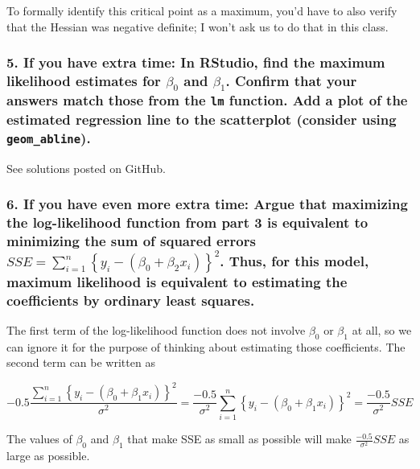 \documentclass[]{article}
\begin{document}
To formally identify this critical point as a maximum, you'd have to
also verify that the Hessian was negative definite; I won't ask us to do
that in this class.

\subsubsection{\texorpdfstring{5. If you have extra time: In RStudio,
find the maximum likelihood estimates for \(\beta_0\) and \(\beta_1\).
Confirm that your answers match those from the \texttt{lm} function. Add
a plot of the estimated regression line to the scatterplot (consider
using
\texttt{geom\_abline}).}{5. If you have extra time: In RStudio, find the maximum likelihood estimates for \textbackslash{}beta\_0 and \textbackslash{}beta\_1. Confirm that your answers match those from the lm function. Add a plot of the estimated regression line to the scatterplot (consider using geom\_abline).}}\label{if-you-have-extra-time-in-rstudio-find-the-maximum-likelihood-estimates-for-beta_0-and-beta_1.-confirm-that-your-answers-match-those-from-the-lm-function.-add-a-plot-of-the-estimated-regression-line-to-the-scatterplot-consider-using-geom_abline.}

See solutions posted on GitHub.

\subsubsection{\texorpdfstring{6. If you have even more extra time:
Argue that maximizing the log-likelihood function from part 3 is
equivalent to minimizing the sum of squared errors
\(SSE = \sum_{i = 1}^n \left\{y_i - (\beta_0 + \beta_2 x_{i}) \right\}^2\).
Thus, for this model, maximum likelihood is equivalent to estimating the
coefficients by ordinary least
squares.}{6. If you have even more extra time: Argue that maximizing the log-likelihood function from part 3 is equivalent to minimizing the sum of squared errors SSE = \textbackslash{}sum\_\{i = 1\}\^{}n \textbackslash{}left\textbackslash{}\{y\_i - (\textbackslash{}beta\_0 + \textbackslash{}beta\_2 x\_\{i\}) \textbackslash{}right\textbackslash{}\}\^{}2. Thus, for this model, maximum likelihood is equivalent to estimating the coefficients by ordinary least squares.}}\label{if-you-have-even-more-extra-time-argue-that-maximizing-the-log-likelihood-function-from-part-3-is-equivalent-to-minimizing-the-sum-of-squared-errors-sse-sum_i-1n-lefty_i---beta_0-beta_2-x_i-right2.-thus-for-this-model-maximum-likelihood-is-equivalent-to-estimating-the-coefficients-by-ordinary-least-squares.}

The first term of the log-likelihood function does not involve
\(\beta_0\) or \(\beta_1\) at all, so we can ignore it for the purpose
of thinking about estimating those coefficients. The second term can be
written as

\[-0.5 \frac{\sum_{i = 1}^n\left\{y_i - (\beta_0 + \beta_1 x_i)\right\}^2}{\sigma^2} =  \frac{-0.5}{\sigma^2}\sum_{i = 1}^n\left\{y_i - (\beta_0 + \beta_1 x_i)\right\}^2 = \frac{-0.5}{\sigma^2} SSE\]

The values of \(\beta_0\) and \(\beta_1\) that make SSE as small as
possible will make \(\frac{-0.5}{\sigma^2} SSE\) as large as possible.
\end{document}
